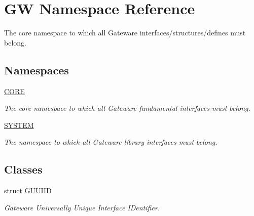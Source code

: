 \hypertarget{namespaceGW}{}\section{GW Namespace Reference}
\label{namespaceGW}


The core namespace to which all Gateware interfaces/structures/defines must belong.  


\subsection*{Namespaces}
\begin{DoxyCompactItemize}
\item 
 \hyperlink{namespaceGW_1_1CORE}{C\+O\+RE}
\begin{DoxyCompactList}\small\item\em The core namespace to which all Gateware fundamental interfaces must belong. \end{DoxyCompactList}\item 
 \hyperlink{namespaceGW_1_1SYSTEM}{S\+Y\+S\+T\+EM}
\begin{DoxyCompactList}\small\item\em The namespace to which all Gateware library interfaces must belong. \end{DoxyCompactList}\end{DoxyCompactItemize}
\subsection*{Classes}
\begin{DoxyCompactItemize}
\item 
struct \hyperlink{structGW_1_1GUUIID}{G\+U\+U\+I\+ID}
\begin{DoxyCompactList}\small\item\em Gateware Universally Unique Interface I\+Dentifier. \end{DoxyCompactList}\end{DoxyCompactItemize}
